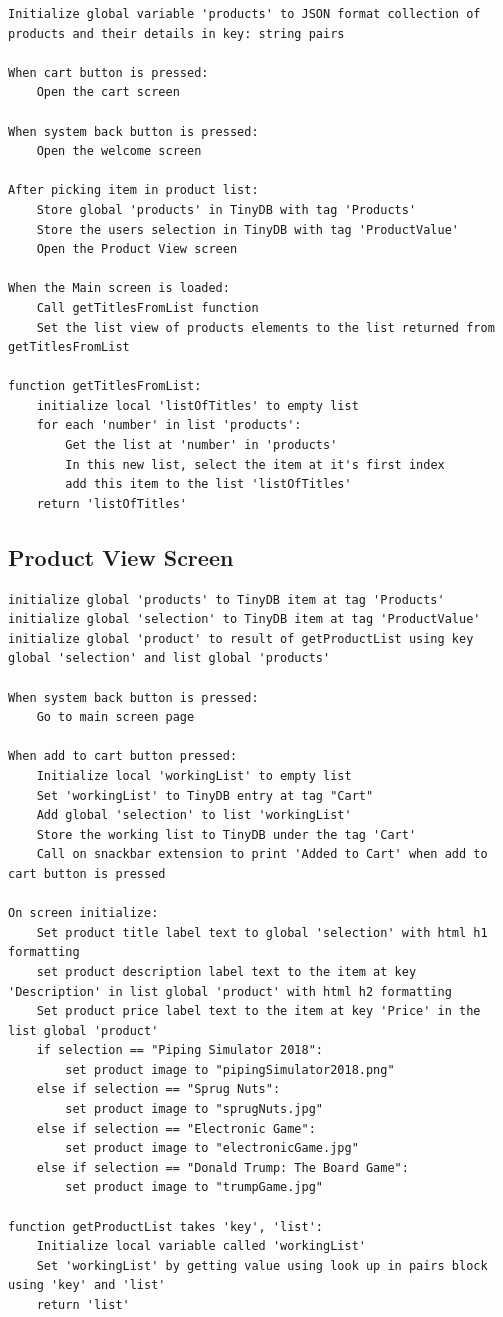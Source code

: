 \documentclass{scrreprt}
\begin{document}
\begin{lstlisting}
Initialize global variable 'products' to JSON format collection of products and their details in key: string pairs

When cart button is pressed:
    Open the cart screen
    
When system back button is pressed:
    Open the welcome screen
    
After picking item in product list:
    Store global 'products' in TinyDB with tag 'Products'
    Store the users selection in TinyDB with tag 'ProductValue'
    Open the Product View screen

When the Main screen is loaded:
    Call getTitlesFromList function
    Set the list view of products elements to the list returned from getTitlesFromList

function getTitlesFromList:
    initialize local 'listOfTitles' to empty list
    for each 'number' in list 'products':
        Get the list at 'number' in 'products'
        In this new list, select the item at it's first index
        add this item to the list 'listOfTitles'
    return 'listOfTitles'
\end{lstlisting}

\subsection*{Product View Screen}

\begin{lstlisting}
initialize global 'products' to TinyDB item at tag 'Products'
initialize global 'selection' to TinyDB item at tag 'ProductValue'
initialize global 'product' to result of getProductList using key global 'selection' and list global 'products'

When system back button is pressed:
    Go to main screen page
    
When add to cart button pressed:
    Initialize local 'workingList' to empty list
    Set 'workingList' to TinyDB entry at tag "Cart"
    Add global 'selection' to list 'workingList'
    Store the working list to TinyDB under the tag 'Cart'
    Call on snackbar extension to print 'Added to Cart' when add to cart button is pressed

On screen initialize:
    Set product title label text to global 'selection' with html h1 formatting
    set product description label text to the item at key 'Description' in list global 'product' with html h2 formatting
    Set product price label text to the item at key 'Price' in the list global 'product'
    if selection == "Piping Simulator 2018":
        set product image to "pipingSimulator2018.png"
    else if selection == "Sprug Nuts":
        set product image to "sprugNuts.jpg"
    else if selection == "Electronic Game":
        set product image to "electronicGame.jpg"
    else if selection == "Donald Trump: The Board Game":
        set product image to "trumpGame.jpg"
        
function getProductList takes 'key', 'list':
    Initialize local variable called 'workingList'
    Set 'workingList' by getting value using look up in pairs block using 'key' and 'list'
    return 'list'
\end{lstlisting}
\end{document}
